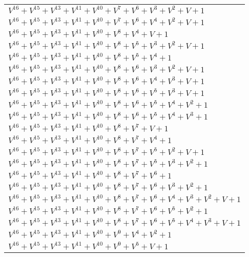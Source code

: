 \documentclass[12pt]{article}
\begin{document}
\begin{adjustwidth}{-4cm}{}
\begin{center}
\begin{longtable}{|l|}
$V^{16}  +V^{15}  +V^{13}  +V^{11}  +V^{10}  +V^{7}  +V^{6}  +V^{3}  +V^{2}  + V + 1$ \\
$V^{16}  +V^{15}  +V^{13}  +V^{11}  +V^{10}  +V^{7}  +V^{6}  +V^{4}  +V^{2}  + V + 1$ \\
$V^{16}  +V^{15}  +V^{13}  +V^{11}  +V^{10}  +V^{8}  +V^{4}  + V + 1$ \\
$V^{16}  +V^{15}  +V^{13}  +V^{11}  +V^{10}  +V^{8}  +V^{5}  +V^{3}  +V^{2}  + V + 1$ \\
$V^{16}  +V^{15}  +V^{13}  +V^{11}  +V^{10}  +V^{8}  +V^{5}  +V^{4}  + 1$ \\
$V^{16}  +V^{15}  +V^{13}  +V^{11}  +V^{10}  +V^{8}  +V^{6}  +V^{3}  +V^{2}  + V + 1$ \\
$V^{16}  +V^{15}  +V^{13}  +V^{11}  +V^{10}  +V^{8}  +V^{6}  +V^{4}  +V^{3}  + V + 1$ \\
$V^{16}  +V^{15}  +V^{13}  +V^{11}  +V^{10}  +V^{8}  +V^{6}  +V^{5}  +V^{3}  + V + 1$ \\
$V^{16}  +V^{15}  +V^{13}  +V^{11}  +V^{10}  +V^{8}  +V^{6}  +V^{5}  +V^{4}  +V^{2}  + 1$ \\
$V^{16}  +V^{15}  +V^{13}  +V^{11}  +V^{10}  +V^{8}  +V^{6}  +V^{5}  +V^{4}  +V^{3}  + 1$ \\
$V^{16}  +V^{15}  +V^{13}  +V^{11}  +V^{10}  +V^{8}  +V^{7}  + V + 1$ \\
$V^{16}  +V^{15}  +V^{13}  +V^{11}  +V^{10}  +V^{8}  +V^{7}  +V^{4}  + 1$ \\
$V^{16}  +V^{15}  +V^{13}  +V^{11}  +V^{10}  +V^{8}  +V^{7}  +V^{5}  +V^{2}  + V + 1$ \\
$V^{16}  +V^{15}  +V^{13}  +V^{11}  +V^{10}  +V^{8}  +V^{7}  +V^{5}  +V^{3}  +V^{2}  + 1$ \\
$V^{16}  +V^{15}  +V^{13}  +V^{11}  +V^{10}  +V^{8}  +V^{7}  +V^{6}  + 1$ \\
$V^{16}  +V^{15}  +V^{13}  +V^{11}  +V^{10}  +V^{8}  +V^{7}  +V^{6}  +V^{3}  +V^{2}  + 1$ \\
$V^{16}  +V^{15}  +V^{13}  +V^{11}  +V^{10}  +V^{8}  +V^{7}  +V^{6}  +V^{4}  +V^{3}  +V^{2}  + V + 1$ \\
$V^{16}  +V^{15}  +V^{13}  +V^{11}  +V^{10}  +V^{8}  +V^{7}  +V^{6}  +V^{5}  +V^{2}  + 1$ \\
$V^{16}  +V^{15}  +V^{13}  +V^{11}  +V^{10}  +V^{8}  +V^{7}  +V^{6}  +V^{5}  +V^{4}  +V^{3}  + V + 1$ \\
$V^{16}  +V^{15}  +V^{13}  +V^{11}  +V^{10}  +V^{9}  +V^{4}  +V^{2}  + 1$ \\
$V^{16}  +V^{15}  +V^{13}  +V^{11}  +V^{10}  +V^{9}  +V^{5}  + V + 1$ \\

\end{longtable}
\end{center}
\end{adjustwidth}
\end{document}
